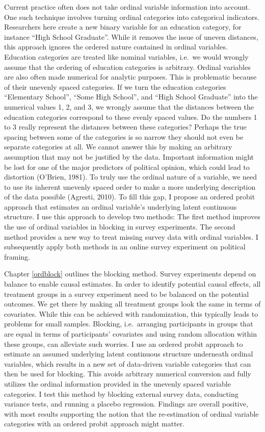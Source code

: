 \documentclass[12pt,econ]{sources/authesis}
\begin{document}
Current practice often does not take ordinal variable information into account. One such technique involves turning ordinal categories into categorical indicators. Researchers here create a new binary variable for an education category, for instance ``High School Graduate''. While it removes the issue of uneven distances, this approach ignores the ordered nature contained in ordinal variables. Education categories are treated like nominal variables, i.e.~we would wrongly assume that the ordering of education categories is arbitrary. Ordinal variables are also often made numerical for analytic purposes. This is problematic because of their unevenly spaced categories. If we turn the education categories ``Elementary School'', ``Some High School'', and ``High School Graduate'' into the numerical values 1, 2, and 3, we wrongly assume that the distances between the education categories correspond to these evenly spaced values. Do the numbers 1 to 3 really represent the distances between these categories? Perhaps the true spacing between some of the categories is so narrow they should not even be separate categories at all. We cannot answer this by making an arbitrary assumption that may not be justified by the data. Important information might be lost for one of the major predictors of political opinion, which could lead to distortion (O'Brien, 1981). To truly use the ordinal nature of a variable, we need to use its inherent unevenly spaced order to make a more underlying description of the data possible (Agresti, 2010). To fill this gap, I propose an ordered probit approach that estimates an ordinal variable's underlying latent continuous structure. I use this approach to develop two methods: The first method improves the use of ordinal variables in blocking in survey experiments. The second method provides a new way to treat missing survey data with ordinal variables. I subsequently apply both methods in an online survey experiment on political framing.

Chapter \ref{ordblock} outlines the blocking method. Survey experiments depend on balance to enable causal estimates. In order to identify potential causal effects, all treatment groups in a survey experiment need to be balanced on the potential outcomes. We get there by making all treatment groups look the same in terms of covariates. While this can be achieved with randomization, this typically leads to problems for small samples. Blocking, i.e.~arranging participants in groups that are equal in terms of participants' covariates and using random allocation within these groups, can alleviate such worries. I use an ordered probit approach to estimate an assumed underlying latent continuous structure underneath ordinal variables, which results in a new set of data-driven variable categories that can then be used for blocking. This avoids arbitrary numerical conversion and fully utilizes the ordinal information provided in the unevenly spaced variable categories. I test this method by blocking external survey data, conducting variance tests, and running a placebo regression. Findings are overall positive, with most results supporting the notion that the re-estimation of ordinal variable categories with an ordered probit approach might matter.
\end{document}
